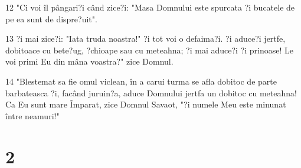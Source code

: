 \par 12 "Ci voi îl pângari?i când zice?i: "Masa Domnului este spurcata ?i bucatele de pe ea sunt de dispre?uit".
\par 13 ?i mai zice?i: "Iata truda noastra!" ?i tot voi o defaima?i. ?i aduce?i jertfe, dobitoace cu bete?ug, ?chioape sau cu meteahna; ?i mai aduce?i ?i prinoase! Le voi primi Eu din mâna voastra?" zice Domnul.
\par 14 "Blestemat sa fie omul viclean, în a carui turma se afla dobitoc de parte barbateasca ?i, facând juruin?a, aduce Domnului jertfa un dobitoc cu meteahna! Ca Eu sunt mare Împarat, zice Domnul Savaot, "?i numele Meu este minunat între neamuri!"

\chapter{2}

